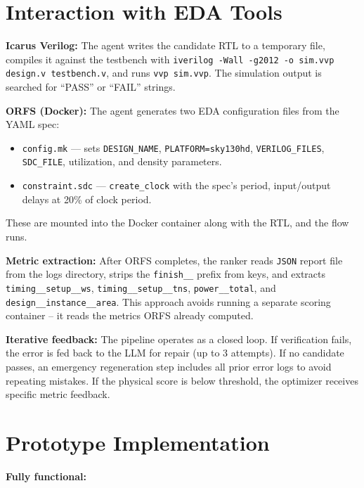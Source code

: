 \documentclass[10pt]{article}
\begin{document}
\section{Interaction with EDA Tools}

\textbf{Icarus Verilog:} The agent writes the candidate RTL to a temporary file, compiles it against the testbench with \texttt{iverilog -Wall -g2012 -o sim.vvp design.v testbench.v}, and runs \texttt{vvp sim.vvp}. The simulation output is searched for ``PASS'' or ``FAIL'' strings.

\textbf{ORFS (Docker):} The agent generates two EDA configuration files from the YAML spec:

\begin{itemize}[topsep=2pt,itemsep=0pt]
  \item \texttt{config.mk} --- sets \texttt{DESIGN\_NAME}, \texttt{PLATFORM=sky130hd}, \texttt{VERILOG\_FILES}, 
    \texttt{SDC\_FILE}, utilization, and density parameters.
  \item \texttt{constraint.sdc} --- \texttt{create\_clock} with the spec's period, input/output delays at 20\% of clock period.
\end{itemize}

These are mounted into the Docker container along with the RTL, and the flow runs. 

\textbf{Metric extraction:} After ORFS completes, the ranker reads \texttt{JSON} report file from the logs directory, strips 
the \texttt{finish\_\_} prefix from keys, and extracts \texttt{timing\_\_setup\_\_ws}, \texttt{timing\_\_setup\_\_tns}, 
\texttt{power\_\_total}, and \texttt{design\_\_instance\_\_area}. This approach avoids running a separate scoring container --
it reads the metrics ORFS already computed.

\textbf{Iterative feedback:} The pipeline operates as a closed loop. If verification fails, the error is fed back to the LLM 
for repair (up to 3 attempts). If no candidate passes, an emergency regeneration step includes all prior error logs to avoid 
repeating mistakes. If the physical score is below threshold, the optimizer receives specific metric feedback.

\section{Prototype Implementation}

\textbf{Fully functional:}
\end{document}
